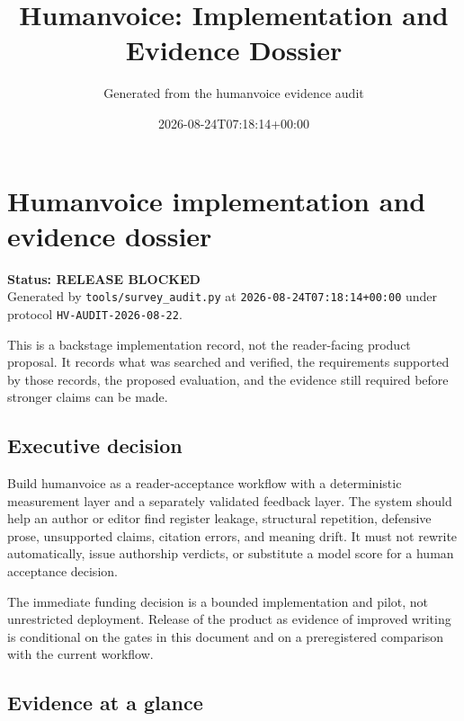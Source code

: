 \documentclass[11pt]{article}
\title{Humanvoice: Implementation and Evidence Dossier}
\author{Generated from the humanvoice evidence audit}
\date{2026-08-24T07:18:14+00:00}
\begin{document}
\hypertarget{humanvoice-implementation-and-evidence-dossier}{%
\section{Humanvoice implementation and evidence dossier}\label{humanvoice-implementation-and-evidence-dossier}}

\textbf{Status: RELEASE BLOCKED}\\
Generated by \texttt{tools/survey\_audit.py} at \texttt{2026-08-24T07:18:14+00:00} under protocol \texttt{HV-AUDIT-2026-08-22}.

This is a backstage implementation record, not the reader-facing product proposal. It records what was searched and verified, the requirements supported by those records, the proposed evaluation, and the evidence still required before stronger claims can be made.

\hypertarget{executive-decision}{%
\subsection{Executive decision}\label{executive-decision}}

Build humanvoice as a reader-acceptance workflow with a deterministic measurement layer and a separately validated feedback layer. The system should help an author or editor find register leakage, structural repetition, defensive prose, unsupported claims, citation errors, and meaning drift. It must not rewrite automatically, issue authorship verdicts, or substitute a model score for a human acceptance decision.

The immediate funding decision is a bounded implementation and pilot, not unrestricted deployment. Release of the product as evidence of improved writing is conditional on the gates in this document and on a preregistered comparison with the current workflow.

\hypertarget{evidence-at-a-glance}{%
\subsection{Evidence at a glance}\label{evidence-at-a-glance}}
\end{document}
